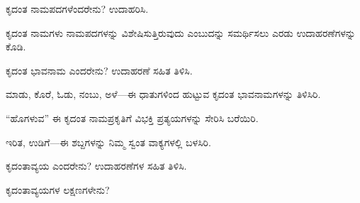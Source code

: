 \vspace{2.5pt plus 3pt minus 0.5pt}\noindent\hspace*{1.2em}\hspace{0.55em}ಕೃದಂತ ನಾಮಪದಗಳೆಂದರೇನು? ಉದಾಹರಿಸಿ.\par

\vspace{2.5pt plus 3pt minus 0.5pt}\noindent\hspace*{1.2em}\hspace{0.55em}ಕೃದಂತ ನಾಮಗಳು ನಾಮಪದಗಳನ್ನು ವಿಶೇಷಿಸುತ್ತಿರುವುದು ಎಂಬುದನ್ನು ಸಮರ್ಥಿಸಲು ಎರಡು ಉದಾಹರಣೆಗಳನ್ನು ಕೊಡಿ.\par

\vspace{2.5pt plus 3pt minus 0.5pt}\noindent\hspace*{1.2em}\hspace{0.55em}ಕೃದಂತ ಭಾವನಾಮ ಎಂದರೇನು? ಉದಾಹರಣೆ ಸಹಿತ ತಿಳಿಸಿ.\par

\vspace{2.5pt plus 3pt minus 0.5pt}\noindent\hspace*{1.2em}\hspace{0.55em}ಮಾಡು, ಕೊರೆ, ಓಡು, ನಂಬು, ಅಳೆ—ಈ ಧಾತುಗಳಿಂದ ಹುಟ್ಟುವ ಕೃದಂತ ಭಾವನಾಮಗಳನ್ನು ತಿಳಿಸಿರಿ.\par

\vspace{2.5pt plus 3pt minus 0.5pt}\noindent\hspace*{1.2em}\hspace{0.55em}“ಹೊಗಳುವ” ಈ ಕೃದಂತ ನಾಮಪ್ರಕೃತಿಗೆ ವಿಭಕ್ತಿ ಪ್ರತ್ಯಯಗಳನ್ನು ಸೇರಿಸಿ ಬರೆಯಿರಿ.\par

\vspace{2.5pt plus 3pt minus 0.5pt}\noindent\hspace*{1.2em}\hspace{0.55em}ಇರಿತ, ಉಡಿಗೆ—ಈ ಶಬ್ದಗಳನ್ನು ನಿಮ್ಮ ಸ್ವಂತ ವಾಕ್ಯಗಳಲ್ಲಿ ಬಳಸಿರಿ.\par

\vspace{2.5pt plus 3pt minus 0.5pt}\noindent\hspace*{1.2em}\hspace{0.55em}ಕೃದಂತಾವ್ಯಯ ಎಂದರೇನು? ಉದಾಹರಣೆಗಳ ಸಹಿತ ತಿಳಿಸಿ.\par

\vspace{2.5pt plus 3pt minus 0.5pt}\noindent\hspace*{1.2em}\hspace{0.55em}ಕೃದಂತಾವ್ಯಯಗಳ ಲಕ್ಷಣಗಳೇನು?\par

